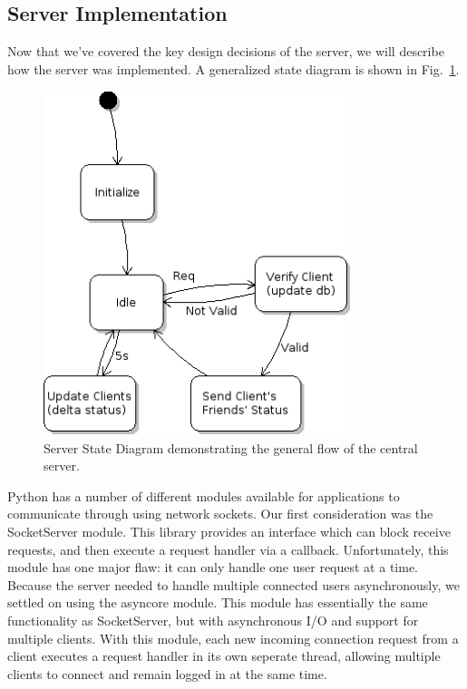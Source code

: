 \subsection{Server Implementation}
Now that we've covered the key design decisions of the server, we will describe how the server
was implemented. A generalized state diagram is shown in Fig.~\ref{fig:server_diag}.

\begin{figure}[!t]
   \centering
      \includegraphics[width=0.8\textwidth]{pics/Server_StateDiagram}
   \caption{Server State Diagram demonstrating the general flow of the central server.}
\label{fig:server_diag}
\end{figure}


Python has a number of different modules available for applications to communicate
through using network sockets. Our first consideration was the SocketServer module. This 
library
provides an interface which can block receive requests, and then execute a request
handler via a callback. Unfortunately, this module has one major flaw: it can only handle
one user request at a time. Because the server needed to handle multiple connected users
asynchronously, we settled on using the asyncore module. This module has essentially
the same functionality as SocketServer, but with asynchronous I/O and support for multiple clients. With this module, each
new incoming connection request from a client executes a request handler in its own seperate thread, allowing 
multiple clients to connect and remain logged in at the same time.

